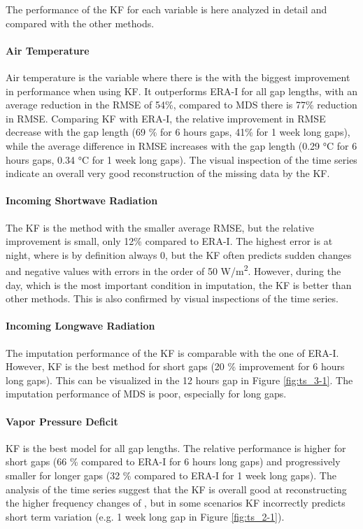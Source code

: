 \documentclass{article}
\begin{document}
The performance of the KF for each variable is here analyzed in detail and compared with the other methods.

\paragraph{Air Temperature} Air temperature is the variable where there is the with the biggest improvement in performance when using KF. It outperforms ERA-I for all gap lengths, with an average reduction in the RMSE of 54\%, compared to MDS there is 77\% reduction in RMSE. Comparing KF with ERA-I, the relative improvement in RMSE decrease with the gap length (69 \% for 6 hours gaps, 41\% for 1 week long gaps), while the average difference in RMSE increases with the gap length (0.29 °C  for 6 hours gaps, 0.34 °C for 1 week long gaps).
The visual inspection of the time series indicate an overall very good reconstruction of the missing data by the KF. 

\paragraph{Incoming Shortwave Radiation} The KF is the method with the smaller average RMSE, but the relative improvement is small, only 12\% compared to ERA-I. The highest error is at night, where  is by definition always 0, but the KF often predicts sudden changes and negative values with errors in the order of 50 \si{W/m^2}. However, during the day, which is the most important condition in  imputation, the KF is better than other methods. This is also confirmed by visual inspections of the time series.

\paragraph{Incoming Longwave Radiation} The imputation performance of the KF is comparable with the one of ERA-I. However, KF is the best method for short gaps (20 \% improvement for 6 hours long gaps). This can be visualized in the 12 hours gap in Figure \ref{fig:ts_3-1}. The imputation performance of MDS is poor, especially for long gaps.

\paragraph{Vapor Pressure Deficit} KF is the best model for all gap lengths. The relative performance is higher for short gaps (66 \% compared to ERA-I for 6 hours long gaps) and progressively smaller for longer gaps (32 \% compared to ERA-I for 1 week long gaps). The analysis of the time series suggest that the KF is overall good at reconstructing the higher frequency changes of , but in some scenarios KF incorrectly predicts short term variation (e.g. 1 week long gap in Figure \ref{fig:ts_2-1}).
\end{document}

